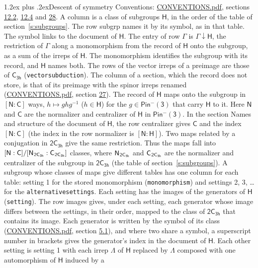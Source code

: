 \documentclass[10pt,a4paper]{article}
\makeatletter
\renewcommand\section{\@startsection{section}{1}{\z@}{-3ex plus -1ex minus -.2ex}%
  {1.2ex plus .2ex}{\normalfont\large\sffamily\bfseries\color{parttitle}}}
\numberwithin{equation}{section}
\newcommand{\grp}[1]{\mathsf{#1}}
\newcommand{\grpindex}[2]{[#1 : #2]}
\newcommand{\restr}[2]{#1\!\downarrow#2}
\newcommand{\hairsp}{\mkern1mu}
\makeatother
\begin{document}
\section{Descent of symmetry}\label{s:subduction}
Conventions: \href{../../CONVENTIONS.pdf}{CONVENTIONS.pdf}, sections \href{../../../rotation/CONVENTIONS.pdf\#conv.12.2}{12.2}, \href{../../../rotation/CONVENTIONS.pdf\#conv.12.4}{12.4} and \href{../../CONVENTIONS.pdf\#conv.28}{28}.
A column is a class of subgroups $\grp{H}$, in the order of the table of section~\ref{s:subgroups}. The row subgrp names it by its symbol, as in that table. The symbol links to the document of $\grp{H}$. The entry of row $\Gamma$ is $\restr{\Gamma}{\grp{H}}$, the restriction of $\Gamma$ along a monomorphism from the record of $\grp{H}$ onto the subgroup, as a sum of the irreps of $\grp{H}$. The monomorphism identifies the subgroup with its record, and $\grp{H}$ names both. The rows of the vector irreps of a preimage are those of \href{../../../rotation/data/pdf/C3h.pdf}{$\grp{C_{3h}}$} (\texttt{vectorsubduction}). The column of a section, which the record does not store, is that of its preimage with the spinor irreps renamed (\href{../../CONVENTIONS.pdf}{CONVENTIONS.pdf}, section \href{../../CONVENTIONS.pdf\#conv.27}{27}). \label{n:group.normalizer.o3}\label{n:group.centralizer.o3}\label{n:element.h}The record of $\grp{H}$ maps onto the subgroup in $\grpindex{\grp{N}}{\grp{C}}$ ways, $h \mapsto g h g^{-1}$ ($h \in \grp{H}$) for the $g \in \grp{Pin^{-}(3)}$ that carry $\grp{H}$ to it. Here $\grp{N}$ and $\grp{C}$ are the normalizer and centralizer of $\grp{H}$ in \href{Pinminus3.pdf}{$\grp{Pin^{-}(3)}$}. In the section Names and structure of the document of $\grp{H}$, the row centralizer gives $\grp{C}$ and the index $\grpindex{\grp{N}}{\grp{C}}$ (the index in the row normalizer is $\grpindex{\grp{N}}{\grp{H}}$). Two maps related by a conjugation in $\grp{2C_{3h}}$ give the same restriction. Thus the maps fall into $\grpindex{\grp{N}}{\grp{C}}/\grpindex{\grp{N}_{\hairsp \grp{2C_{3h}}}}{\grp{C}_{\hairsp \grp{2C_{3h}}}}$ classes, where $\grp{N}_{\hairsp \grp{2C_{3h}}}$ and $\grp{C}_{\hairsp \grp{2C_{3h}}}$ are the normalizer and centralizer of the subgroup in $\grp{2C_{3h}}$ (the table of section~\ref{s:subgroups}). \label{n:head.setting}A subgroup whose classes of maps give different tables has one column for each table: setting 1 for the stored monomorphism (\texttt{monomorphism}) and settings 2, 3, \dots{} for the \texttt{alternativesettings}. Each setting has the images of the generators of $\grp{H}$ (\texttt{setting}). \label{n:head.images}The row images gives, under each setting, each generator whose image differs between the settings, in their order, mapped to the class of $\grp{2C_{3h}}$ that contains its image. Each generator is written by the symbol of its class (\href{../../CONVENTIONS.pdf}{CONVENTIONS.pdf}, section \href{../../../rotation/CONVENTIONS.pdf\#conv.5.1}{5.1}), and where two share a symbol, a superscript number in brackets gives the generator's index in the document of $\grp{H}$. \label{n:irrep.Delta}Each other setting is setting 1 with each irrep $\Lambda$ of $\grp{H}$ replaced by $\Lambda$ composed with one automorphism of $\grp{H}$ induced by a 
\end{document}
